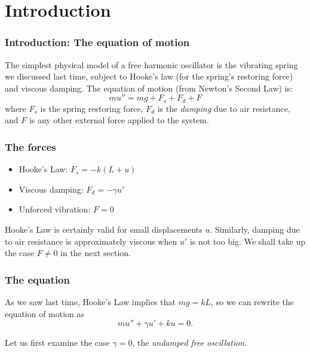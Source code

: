 \def\encoding{UTF-8}

\def\mytitle{Free harmonic oscillators}
\def\subtitle{(while supplies last)}
\def\affiliation{The College of Idaho}
\def\myauthor{Math 352 Differential Equations}
\def\mydate{15 April 2013}
\def\latexmode{beamer}

\def\htmlheaderlevel{2}
\section{Introduction}
\label{introduction}

\begin{frame}

\frametitle{Introduction: The equation of motion}
\label{introduction:theequationofmotion}

The simplest physical model of a free harmonic oscillator is the vibrating spring we discussed last time, subject to Hooke's law (for the spring's restoring force) and viscous damping. The equation of motion (from Newton's Second Law) is:
 \pause 
\[
    mu'' = mg + F_s + F_d + F
\]
where $ F_s $ is the spring restoring force, $ F_d $ is the \emph{damping} due to air resistance, and $ F $ is any other external force applied to the system.

\end{frame}

\begin{frame}

\frametitle{The forces}
\label{theforces}

\begin{itemize}
\item Hooke's Law: $ F_s = -k(L + u) $

\item Viscous damping: $ F_d = -\gamma u' $

\item Unforced vibration: $ F = 0 $

\end{itemize}

Hooke's Law is certainly valid for small displacements $ u $. Similarly, damping due to air resistance is approximately viscous when $ u' $ is not too big. We shall take up the case $ F \ne 0 $ in the next section.

\end{frame}

\begin{frame}

\frametitle{The equation}
\label{theequation}

As we saw last time, Hooke's Law implies that $ mg = kL $, so we can rewrite the equation of motion as
\[
    mu'' + \gamma u' + ku = 0.
\]

Let us first examine the case $ \gamma = 0 $, the \emph{undamped free oscillation}.

\end{frame}

